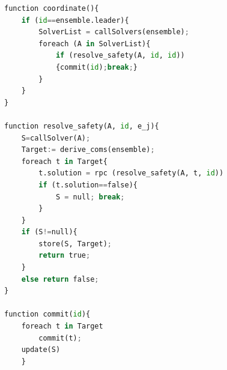\documentclass[journal]{IEEEtran}
\theoremstyle{definition}
\newcommand\darko[1]{\nb{Darko}{#1}}
\begin{document}









\begin{lstlisting}[language=Python]

\end{lstlisting}








\begin{lstlisting}[caption=Code snippets from the Planning and Execution state, language=Python]
function coordinate(){
	if (id==ensemble.leader){
		SolverList = callSolvers(ensemble);
		foreach (A in SolverList){
			if (resolve_safety(A, id, id))
			{commit(id);break;}
		}
	}
}

function resolve_safety(A, id, e_j){
	S=callSolver(A); 
    Target:= derive_coms(ensemble);
    foreach t in Target{
		t.solution = rpc (resolve_safety(A, t, id))
		if (t.solution==false){
			S = null; break;
		}
	}
	if (S!=null){
		store(S, Target);
		return true;
	}
	else return false;
}

function commit(id){
	foreach t in Target
		commit(t);
	update(S)
	}
\end{lstlisting}


\darko{END}
\end{document}
